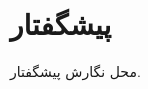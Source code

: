 \documentclass[12pt]{report}
\begin{document}
	
	\onehalfspacing
	
	\chapter*{پیشگفتار }
	محل نگارش پیشگفتار.
	
	
	\tableofcontents
	
\end{document}
